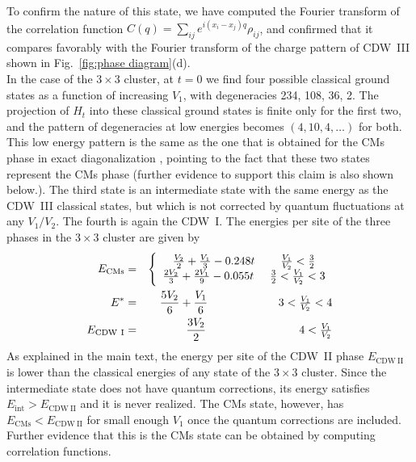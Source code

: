 \documentclass[aps,prx,10pt,twocolumn,floatfix,superscriptaddress,showpacs,numerical,footinbib]{revtex4-1}
\begin{document}
%
To confirm the nature of this state, we have computed the Fourier transform of the correlation function $C(q) = \sum_{ij} e^{i(x_i-x_j)q} \rho_{ij}$, and confirmed that it compares favorably with the Fourier transform of the charge pattern of CDW~III shown in Fig.~\ref{fig:phase diagram}(d).\\
%
In the case of the $3\times3$ cluster, at $t=0$ we find four possible classical ground states as a function of increasing $V_1$, with degeneracies 234, 108, 36, 2.
%
The projection of $H_t$ into these classical ground states is finite only for the first two, and the pattern of degeneracies at low energies becomes $(4,10,4,\ldots)$ for both.
%
This low energy pattern is the same as the one that is obtained for the CMs phase in exact diagonalization \cite{GGNVC13}, 
pointing to the fact that these two states represent the CMs phase (further evidence to support this claim is also shown below.).  
%
The third state is an intermediate state with the same energy as the CDW~III classical states, but which is not corrected by quantum fluctuations at any $V_1/V_2$.  
%
The fourth is again the CDW~I. 
%
The energies per site of the three phases in the $3\times3$ cluster are given by
%
\begin{eqnarray}
E_{\mathrm{CMs}} &=& \left\{ \begin{array}{c} \frac{V_2}{2} + \frac{V_1}{3} -0.248t \hspace{8mm} \tfrac{V_1}{V_2} < \tfrac{3}{2} \\  
\frac{2V_2}{3} + \frac{2V_1}{9} -0.055t \hspace{5mm}   \tfrac{3}{2} <\tfrac{V_1}{V_2} < 3\end{array} \right. \\
E^* &=& \frac{5V_2}{6} + \frac{V_1}{6} \hspace{22mm}   3 <\tfrac{V_1}{V_2} < 4 \\
E_{\mathrm{CDW~I}} &=& \frac{3V_2}{2}   \hspace{29mm}   4 < \tfrac{V_1}{V_2} 
\end{eqnarray}
%
As explained in the main text, the energy per site of the CDW~II phase $E_{\mathrm{CDW~II}}$ is lower than the classical energies of any state of the $3\times3$ cluster. 
%
Since the intermediate state does not have quantum corrections, its energy satisfies $E_{\mathrm{int}}>E_{\mathrm{CDW~II}}$ and it is never realized. 
%
The CMs state, however, has $E_{\mathrm{CMs}} < E_{\mathrm{CDW~II}}$ for small enough $V_1$ once the quantum corrections are included. 
%
Further evidence that this is the CMs state can be obtained by computing correlation functions. 
\end{document}
